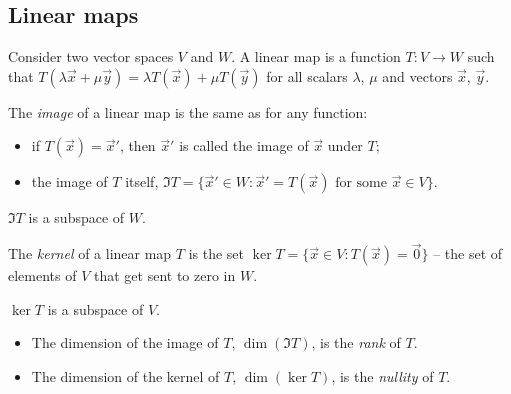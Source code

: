 \documentclass{../../template/note}
\begin{document}
    \subsection{Linear maps}

    \begin{definition} 
        Consider two vector spaces \(V\) and \(W\). A linear map is a function \(T: V \to W\) such that \(T(\lambda \vec x + \mu \vec y) = \lambda T(\vec x) + \mu T(\vec y)\) for all scalars \(\lambda\), \(\mu\) and vectors \(\vec x\), \(\vec y\).
    \end{definition}
    
    \begin{definition}
        The \emph{image} of a linear map is the same as for any function:
        \begin{itemize}
            \item if \(T(\vec x) = \vec x'\), then \(\vec x'\) is called the image of \(\vec x\) under \(T\);
            \item the image of \(T\) itself, \(\Im T = \{\vec x' \in W : \vec x' = T(\vec x) \text{ for some } \vec x \in V\}\).
        \end{itemize}
    \end{definition}
    
    \begin{proposition}
        \(\Im T\) is a subspace of \(W\).
    \end{proposition}
    
    \begin{definition}
        The \emph{kernel} of a linear map \(T\) is the set \(\ker T = \{\vec x \in V: T(\vec x) = \vec 0\}\) -- the set of elements of \(V\) that get sent to zero in \(W\).
    \end{definition}
    
    \begin{proposition}
        \(\ker T\) is a subspace of \(V\).
    \end{proposition}
    
    \begin{definition}
        \begin{itemize}
            \item The dimension of the image of \(T\), \(\dim(\Im T)\), is the \emph{rank} of \(T\).
            \item The dimension of the kernel of \(T\), \(\dim(\ker T)\), is the \emph{nullity} of \(T\).
        \end{itemize}
    \end{definition}
    
\end{document}
